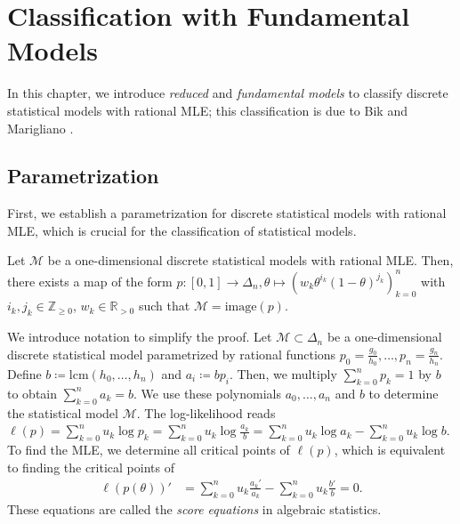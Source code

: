 \chapter{Classification with Fundamental Models}

In this chapter, we introduce \emph{reduced} and \emph{fundamental models} to classify discrete statistical models with rational MLE; this classification is due to Bik and Marigliano \cite{bik2022classifying}. 

\section{Parametrization}

First, we establish a parametrization for discrete statistical models with rational MLE, which is crucial for the classification of statistical models.

\begin{proposition}\label{prop:parametrization}
    Let \( \mathcal{M} \) be a one-dimensional discrete statistical models with rational MLE. Then, there exists a map of the form \( p: [0,1] \to \Delta_n, \theta \mapsto (w_k \theta^{i_k} (1-\theta)^{j_k})_{k=0}^n \) with \( i_k, j_k \in \mathbb{Z}_{\geq 0} \), \( w_k \in \mathbb{R}_{> 0} \) such that \( \mathcal{M} = \mathrm{image}(p) \).
\end{proposition}

We introduce notation to simplify the proof.
Let \( \mathcal{M} \subset \Delta_n \) be a one-dimensional discrete statistical model parametrized by rational functions \( p_0 =  \frac{g_0}{h_0}, \dots, p_n =  \frac{g_n}{h_n} \). Define \( b \coloneqq \mathrm{lcm}(h_0, \dots, h_n) \) and \( a_i \coloneqq b p_i \). Then, we multiply \( \sum_{k=0}^n p_k = 1 \) by \( b \) to obtain \( \sum_{k=0}^n a_k = b \). We use these polynomials \( a_0, \dots, a_n \) and \( b \) to determine the statistical model \( \mathcal{M} \). The log-likelihood reads \( \ell(p) = \sum_{k=0}^n u_k \log p_k = \sum_{k=0}^n u_k \log \frac{a_k}{b} = \sum_{k=0}^n u_k \log a_k - \sum_{k=0}^n u_k \log b \).
To find the MLE, we determine all critical points of \( \ell(p) \), which is equivalent to finding the critical points of
\begin{align}\label{eq:score-equations}
    \ell(p(\theta))' &= \sum_{k=0}^n u_k \frac{a_k'}{a_k} - \sum_{k=0}^n u_k \frac{b'}{b} = 0.
\end{align}
These equations are called the \emph{score equations} in algebraic statistics.

